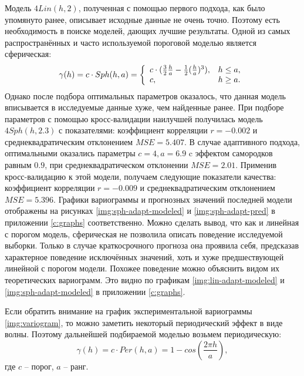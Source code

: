 Модель $ 4 Lin(h, 2) $, полученная с помощью первого подхода, как было упомянуто ранее, описывает исходные данные не очень точно. Поэтому есть необходимость в поиске моделей, дающих лучшие результаты. Одной из самых распространённых и часто используемой пороговой моделью является сферическая:
\begin{equation*}
	\gamma(h) = c \cdot Sph(h, a) = \left\{
		\begin{array}{l l}
			c \cdot (\frac{3}{2} \frac{h}{a} - \frac{1}{2}(\frac{h}{a})^3), & h \le a, \\
			c, & h \geq a.
		\end{array} \right.
\end{equation*}
Однако после подбора оптимальных параметров оказалось, что данная модель вписывается в исследуемые данные хуже, чем найденные ранее. При подборе параметров с помощью кросс-валидации наилучшей получилась модель $ 4 Sph(h, 2.3) $ с показателями: коэффициент корреляции $ r = -0.002$ и среднеквадратическим отклонением $ MSE = 5.407$. В случае адаптивного подхода, оптимальными оказались параметры $ c = 4, a = 6.9 $ c эффектом самородков равным $ 0.9 $, при среднеквадратическом отклонении $ MSE = 2.01 $. Применив кросс-валидацию к этой модели, получаем следующие показатели качества: коэффициент корреляции $ r = -0.009 $ и среднеквадратическим отклонением $ MSE = 5.396 $. Графики вариограммы и прогнозных значений последней модели отображены на рисунках \ref{img:sph-adapt-modeled} и \ref{img:sph-adapt-pred} в приложении \ref{c:graphs} соответственно. Можно сделать вывод, что как и линейная с порогом модель, сферическая не позволила описать поведение исследуемой выборки. Только в случае краткосрочного прогноза она проявила себя, предсказав характерное поведение исключённых значений, хоть и хуже предшествующей линейной с порогом модели. Похожее поведение можно объяснить видом их теоретических вариограмм. Это видно по графикам \ref{img:lin-adapt-modeled} и \ref{img:sph-adapt-modeled} в приложении \ref{c:graphs}.

Если обратить внимание на график экспериментальной вариограммы \ref{img:variogram}, то можно заметить некоторый периодический эффект в виде волны. Поэтому дальнейшей подбираемой моделью возьмем периодическую:
\begin{equation*}
	\gamma(h) = c \cdot Per(h, a) = 1 - cos(\frac{2 \pi h}{a}),
\end{equation*}
где $ c $ -- порог, $ a $ -- ранг.

